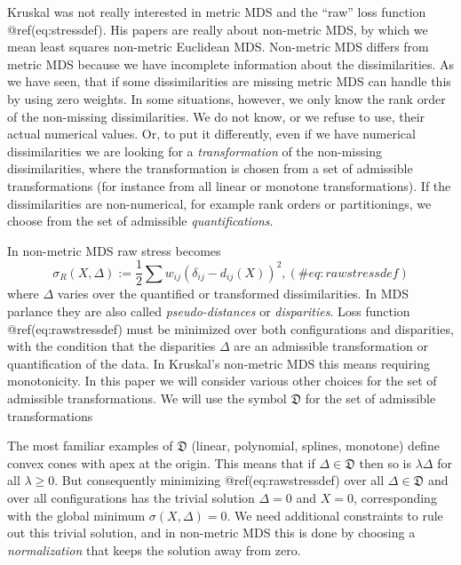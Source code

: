 \documentclass[
  12pt,
  letterpaper,
  DIV=11,
  numbers=noendperiod]{scrartcl}
\theoremstyle{plain}
\theoremstyle{remark}
\begin{document}
Kruskal was not really interested in metric MDS and the ``raw'' loss
function @ref(eq:stressdef). His papers are really about non-metric MDS,
by which we mean least squares non-metric Euclidean MDS. Non-metric MDS
differs from metric MDS because we have incomplete information about the
dissimilarities. As we have seen, that if some dissimilarities are
missing metric MDS can handle this by using zero weights. In some
situations, however, we only know the rank order of the non-missing
dissimilarities. We do not know, or we refuse to use, their actual
numerical values. Or, to put it differently, even if we have numerical
dissimilarities we are looking for a \emph{transformation} of the
non-missing dissimilarities, where the transformation is chosen from a
set of admissible transformations (for instance from all linear or
monotone transformations). If the dissimilarities are non-numerical, for
example rank orders or partitionings, we choose from the set of
admissible \emph{quantifications}.

In non-metric MDS raw stress becomes \begin{equation}
\sigma_R(X,\Delta):=\frac12\sum w_{ij}(\delta_{ij}-d_{ij}(X))^2,
(\#eq:rawstressdef)
\end{equation} where \(\Delta\) varies over the quantified or
transformed dissimilarities. In MDS parlance they are also called
\emph{pseudo-distances} or \emph{disparities}. Loss function
@ref(eq:rawstressdef) must be minimized over both configurations and
disparities, with the condition that the disparities \(\Delta\) are an
admissible transformation or quantification of the data. In Kruskal's
non-metric MDS this means requiring monotonicity. In this paper we will
consider various other choices for the set of admissible
transformations. We will use the symbol \(\mathfrak{D}\) for the set of
admissible transformations

The most familiar examples of \(\mathfrak{D}\) (linear, polynomial,
splines, monotone) define convex cones with apex at the origin. This
means that if \(\Delta\in\mathfrak{D}\) then so is \(\lambda\Delta\) for
all \(\lambda\geq 0\). But consequently minimizing @ref(eq:rawstressdef)
over all \(\Delta\in\mathfrak{D}\) and over all configurations has the
trivial solution \(\Delta=0\) and \(X=0\), corresponding with the global
minimum \(\sigma(X,\Delta)=0\). We need additional constraints to rule
out this trivial solution, and in non-metric MDS this is done by
choosing a \emph{normalization} that keeps the solution away from zero.
\end{document}
